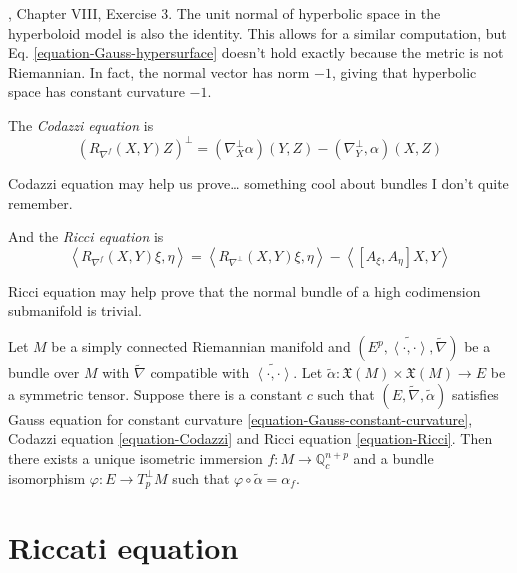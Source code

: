 \begin{example}
\label{example-hyperbolic-space}
\cite{doc}, Chapter VIII, Exercise 3. The unit normal of hyperbolic space in the
hyperboloid model is also the identity. This allows for a similar computation,
but Eq. \ref{equation-Gauss-hypersurface} doesn't hold exactly because the
metric is not Riemannian. In fact, the normal vector has norm $-1$, giving that
hyperbolic space has constant curvature $-1$.
\end{example}

The {\it Codazzi equation} is
\begin{equation}
\label{equation-Codazzi}
(R_{\nabla^f}(X,Y)Z)^\perp
=(\nabla^\perp_X\alpha)(Y,Z)-(\nabla^\perp_Y,\alpha)(X,Z)
\end{equation}

Codazzi equation may help us prove… something cool about bundles I don't quite
remember.

And the {\it Ricci equation} is
\begin{equation}
\label{equation-Ricc}
\left<R_{\nabla^f}(X,Y)\xi,\eta\right>
=\left<R_{\nabla^\perp}(X,Y)\xi,\eta\right>
-\left<[A_\xi,A_\eta]X,Y\right>
\end{equation}

Ricci equation may help prove that the normal bundle of a high codimension
submanifold is trivial.

\begin{theorem}
\label{theorem-fundamental-theorem-of-submanifolds}
Let $M$ be a simply connected Riemannian manifold and
$(E^p,\widetilde{\left<\cdot,\cdot\right>},\tilde{\nabla})$ be a bundle over
$M$ with $\tilde{\nabla}$ compatible with $\widetilde{\left<\cdot,\cdot\right>}$.
Let $\tilde{\alpha}:\mathfrak{X}(M)\times \mathfrak{X}(M)\to E$ be a symmetric
tensor. Suppose there is a constant $c$ such that
$(E,\tilde{\nabla},\tilde{\alpha})$ satisfies Gauss equation for constant
curvature \ref{equation-Gauss-constant-curvature}, Codazzi equation
\ref{equation-Codazzi} and Ricci equation \ref{equation-Ricci}. 
Then there exists a unique isometric
immersion $f:M \to \mathbb{Q}_c^{n+p}$ and a bundle isomorphism $\varphi:E \to
T^\perp_pM$ such that $\varphi\circ\tilde{\alpha}=\alpha_f$.
\end{theorem}

\section{Riccati equation}
\label{section-Riccati-equation}


